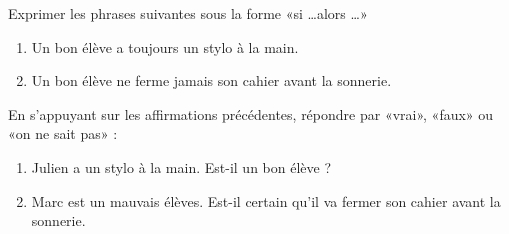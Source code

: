 
\begin{exercice}\label{exosmath-0782}

    Exprimer les phrases suivantes sous la forme «si \ldots alors \ldots» 
    \begin{enumerate}
        \item
            Un bon élève a toujours un stylo à la main.
        \item
            Un bon élève ne ferme jamais son cahier avant la sonnerie.
    \end{enumerate}
    En s'appuyant sur les affirmations précédentes, répondre par «vrai», «faux» ou «on ne sait pas» :
    \begin{enumerate}
        \item
            Julien a un stylo à la main. Est-il un bon élève ?
        \item
            Marc est un mauvais élèves. Est-il certain qu'il va fermer son cahier avant la sonnerie.
    \end{enumerate}

\end{exercice}
